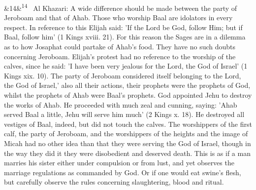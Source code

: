 \documentclass[12pt]{article}
\newcommand{\para}[1][]{\par\noindent\ifx&#1&\else\textsuperscript{\footnotesize #1}~\fi}
\begin{document}
\para[14] Al Khazari: A wide difference should be made between the party of Jeroboam and that of Ahab. Those who worship Baal are idolators in every respect. In reference to this Elijah said: 'If the Lord be God, follow Him; but if Baal, follow him' (1 Kings xviii. 21). For this reason the Sages are in a dilemma as to how Josaphat could partake of Ahab's food. They have no such doubts concerning Jeroboam. Elijah's protest had no reference to the worship of the calves, since he said: 'I have been very jealous for the Lord, the God of Israel' (1 Kings xix. 10). The party of Jeroboam considered itself belonging to the Lord, the God of Israel,' also all their actions, their prophets were the prophets of God, whilst the prophets of Ahab were Baal's prophets. God appointed Jehu to destroy the works of Ahab. He proceeded with much zeal and cunning, saying: 'Ahab served Baal a little, Jehu will serve him much' (2 Kings x. 18). He destroyed all vestiges of Baal, indeed, but did not touch the calves. The worshippers of the first calf, the party of Jeroboam, and the worshippers of the heights and the image of Micah had no other idea than that they were serving the God of Israel, though in the way they did it they were disobedient and deserved death. This is as if a man marries his sister either under compulsion or from lust, and yet observes the marriage regulations as commanded by God. Or if one would eat swine's flesh, but carefully observe the rules concerning slaughtering, blood and ritual.
\end{document}

